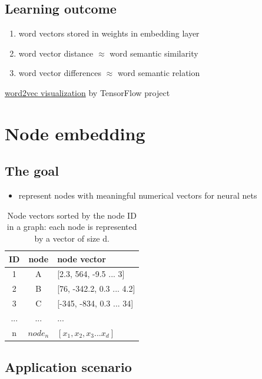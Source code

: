 \documentclass{article}
\begin{document}
\subsection{Learning outcome}
\begin{enumerate}
	\item word vectors stored in weights in embedding layer
	\item word vector distance $ \approx $ word semantic similarity
	\item word vector differences $ \approx $ word semantic relation
\end{enumerate}
\href{https://www.tensorflow.org/versions/r0.7/tutorials/word2vec/index.html}{word2vec visualization} by TensorFlow project

\section{Node embedding}

\subsection{The goal}
\begin{itemize}
	\item represent nodes with meaningful numerical vectors for neural nets
\end{itemize}
\begin{table}[H]
	\centering
	\begin{tabularx}{0.5\textwidth}{|c|c|X|} \hline
		ID & node & node vector \\ \hline
		1 & A & [2.3, 564, -9.5 ... 3] \\ \hline
		2 & B & [76, -342.2, 0.3 ... 4.2] \\ \hline
		3 & C & [-345, -834, 0.3 ... 34] \\ \hline
		... & ... & ... \\ \hline
		n & $ node_n $ & $ [x_1, x_2, x_3 ... x_d] $ \\ \hline
	\end{tabularx}
	\caption{Node vectors sorted by the node ID in a graph: each node is represented by a vector of size d.}
	\label{tab:node}
\end{table}

\subsection{Application scenario}
\end{document}
